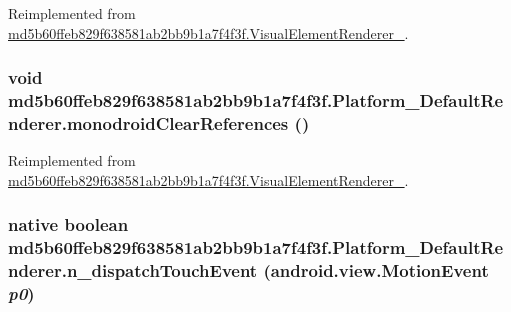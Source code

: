 Reimplemented from \hyperlink{classmd5b60ffeb829f638581ab2bb9b1a7f4f3f_1_1_visual_element_renderer__1_321b2967faff34b0f7971f55915f583e}{md5b60ffeb829f638581ab2bb9b1a7f4f3f.VisualElementRenderer\_}.\hypertarget{classmd5b60ffeb829f638581ab2bb9b1a7f4f3f_1_1_platform___default_renderer_27a3fcd4a55447ba5df4a3eef8c52982}{
\subsubsection[{monodroidClearReferences}]{\setlength{\rightskip}{0pt plus 5cm}void md5b60ffeb829f638581ab2bb9b1a7f4f3f.Platform\_\-DefaultRenderer.monodroidClearReferences ()}}
\label{classmd5b60ffeb829f638581ab2bb9b1a7f4f3f_1_1_platform___default_renderer_27a3fcd4a55447ba5df4a3eef8c52982}




Reimplemented from \hyperlink{classmd5b60ffeb829f638581ab2bb9b1a7f4f3f_1_1_visual_element_renderer__1_4a1c180026d8eab71549e47b7de4b9b8}{md5b60ffeb829f638581ab2bb9b1a7f4f3f.VisualElementRenderer\_}.\hypertarget{classmd5b60ffeb829f638581ab2bb9b1a7f4f3f_1_1_platform___default_renderer_099fc6dfc3ae7b6ee05e01cd5ae0716c}{
\subsubsection[{n\_\-dispatchTouchEvent}]{\setlength{\rightskip}{0pt plus 5cm}native boolean md5b60ffeb829f638581ab2bb9b1a7f4f3f.Platform\_\-DefaultRenderer.n\_\-dispatchTouchEvent (android.view.MotionEvent {\em p0})}}
\label{classmd5b60ffeb829f638581ab2bb9b1a7f4f3f_1_1_platform___default_renderer_099fc6dfc3ae7b6ee05e01cd5ae0716c}




